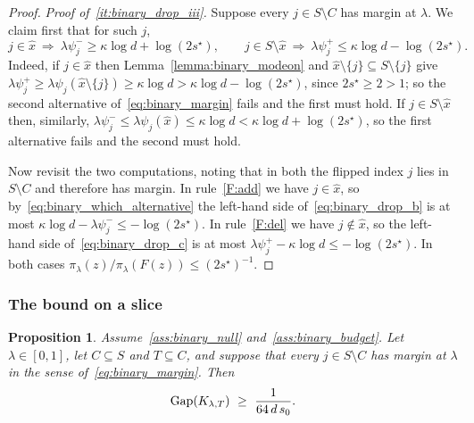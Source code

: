 \documentclass[aos]{imsart}%
\theoremstyle{plain}
\newtheorem{proposition}{Proposition}[section]
\theoremstyle{definition}
\begin{document}
\begin{proof}
        \emph{Proof of~\ref{it:binary_drop_iii}.} Suppose every
        $j\in S\setminus C$ has margin at $\lambda$. We claim first that for
        such $j$,
        \begin{equation}
            \label{eq:binary_which_alternative}
            j\in\hat x\ \Longrightarrow\
            \lambda\psi_j^{-}\geq\kappa\log d+\log(2s^{\star}),
            \qquad
            j\in S\setminus\hat x\ \Longrightarrow\
            \lambda\psi_j^{+}\leq\kappa\log d-\log(2s^{\star}).
        \end{equation}
        Indeed, if $j\in\hat x$ then Lemma~\ref{lemma:binary_modeon} and
        $\hat x\setminus\{j\}\subseteq S\setminus\{j\}$ give
        $\lambda\psi_j^{+}\geq\lambda\psi_j(\hat x\setminus\{j\})
        \geq\kappa\log d>\kappa\log d-\log(2s^{\star})$, since
        $2s^{\star}\geq2>1$; so the second alternative
        of~\eqref{eq:binary_margin} fails and the first must hold. If
        $j\in S\setminus\hat x$ then, similarly,
        $\lambda\psi_j^{-}\leq\lambda\psi_j(\hat x)\leq\kappa\log
        d<\kappa\log d+\log(2s^{\star})$, so the first alternative fails and
        the second must hold.

        Now revisit the two computations, noting that in both the flipped index
        $j$ lies in $S\setminus C$ and therefore has margin. In
        rule~\ref{F:add} we have $j\in\hat x$, so
        by~\eqref{eq:binary_which_alternative} the left-hand side
        of~\eqref{eq:binary_drop_b} is at most
        $\kappa\log d-\lambda\psi_j^{-}\leq-\log(2s^{\star})$. In
        rule~\ref{F:del} we have $j\notin\hat x$, so the left-hand side
        of~\eqref{eq:binary_drop_c} is at most
        $\lambda\psi_j^{+}-\kappa\log d\leq-\log(2s^{\star})$. In both cases
        $\pi_\lambda(z)/\pi_\lambda(F(z))\leq(2s^{\star})^{-1}$.
    \end{proof}

    \subsubsection{The bound on a slice}

    \begin{proposition}
        \label{prop:binary_slice_gap}
        Assume~\ref{ass:binary_null} and~\ref{ass:binary_budget}. Let
        $\lambda\in[0,1]$, let $C\subseteq S$ and $T\subseteq C$, and suppose
        that every $j\in S\setminus C$ has margin at $\lambda$ in the sense
        of~\eqref{eq:binary_margin}. Then
        \begin{equation}
            \label{eq:binary_slice_gap}
            \mathrm{Gap}(K_{\lambda,T})\ \geq\ \frac{1}{64\,d\,s_0} .
        \end{equation}
    \end{proposition}
\end{document}
